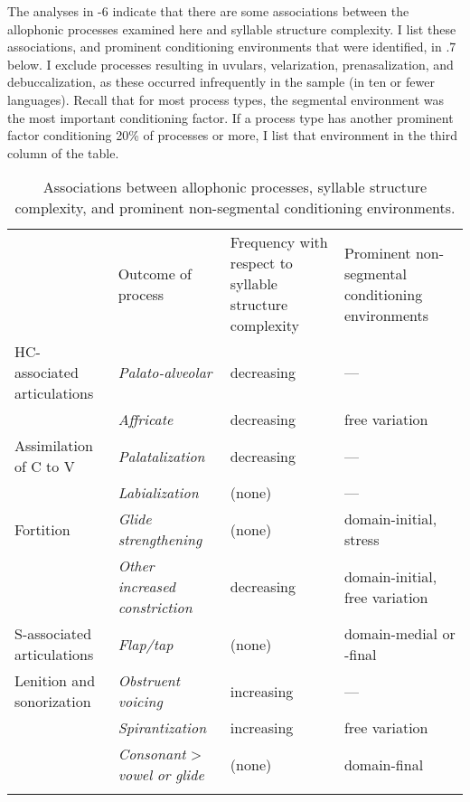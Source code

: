   The analyses in -6 indicate that there are some associations between the allophonic processes examined here and syllable structure complexity. I list these associations, and prominent conditioning environments that were identified, in .7 below. I exclude processes resulting in uvulars, velarization, prenasalization, and debuccalization, as these occurred infrequently in the sample (in ten or fewer languages). Recall that for most process types, the segmental environment was the most important conditioning factor. If a process type has another prominent factor conditioning 20\% of processes or more, I list that environment in the third column of the table.

\begin{table}
\begin{tabularx}{\textwidth}{XXXX}
\lsptoprule
 & Outcome of process & Frequency with respect to syllable structure complexity & Prominent non-segmental conditioning environments\\
HC-associated articulations & \textit{Palato-alveolar} & decreasing & —\\
\hhline{-~~~} & \textit{Affricate} & decreasing & free variation\\
Assimilation of C to V & \textit{Palatalization} & decreasing & —\\
\hhline{-~~~} & \textit{Labialization} & (none) & —\\
Fortition & \textit{Glide} \textit{strengthening} & (none) & domain-initial, stress\\
\hhline{-~~~} & \textit{Other} \textit{increased} \textit{constriction} & decreasing & domain-initial, free variation\\
S-associated articulations & \textit{Flap/tap} & (none) & domain-medial or -final\\
Lenition and sonorization & \textit{Obstruent} \textit{voicing} & increasing & —\\
\hhline{-~~~} & \textit{Spirantization} & increasing & free variation\\
& \textit{Consonant} > \textit{vowel} \textit{or} \textit{glide} & (none) & domain-final\\
\hhline{~---}
\lspbottomrule
\end{tabularx}
\caption{\label{7.7}Associations between allophonic processes, syllable structure complexity, and prominent non-segmental conditioning environments.}
\end{table}

